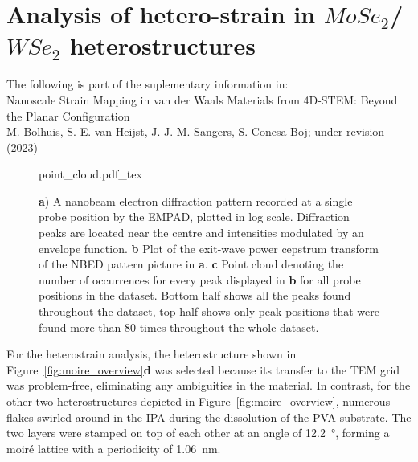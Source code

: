 \section{Analysis of hetero-strain in $MoSe_2$/$WSe_2$ heterostructures}
{\color{gray}\small The following is part of the suplementary information in:\\
Nanoscale Strain Mapping in van der Waals Materials from 4D-STEM: Beyond the Planar Configuration\\
M. Bolhuis, S. E. van Heijst, J. J. M. Sangers, S. Conesa-Boj; under revision (2023)}
\begin{figure}[t]
    \centering
    \def\svgwidth{.95\linewidth}
    {point_cloud.pdf_tex}
    \caption{\textbf{a}) A nanobeam electron diffraction pattern recorded at a single probe position by the EMPAD, plotted in log scale. Diffraction peaks are located near the centre and intensities modulated by an envelope function. \textbf{b} Plot of the exit-wave power cepstrum transform of the NBED pattern picture in \textbf{a}. \textbf{c} Point cloud denoting the number of occurrences for every peak displayed in \textbf{b} for all probe positions in the dataset. Bottom half shows all the peaks found throughout the dataset, top half shows only peak positions that were found more than 80 times throughout the whole dataset.}
    \label{fig:point_cloud}
\end{figure}

For the heterostrain analysis, the heterostructure shown in Figure~\ref{fig:moire_overview}\textbf{d} was selected because its transfer to the TEM grid was problem-free, eliminating any ambiguities in the material. In contrast, for the other two heterostructures depicted in Figure~\ref{fig:moire_overview}, numerous flakes swirled around in the IPA during the dissolution of the PVA substrate. The two layers were stamped on top of each other at an angle of \SI{12.2}{\degree}, forming a moiré lattice with a periodicity of \SI{1.06}{\nano\meter}.

